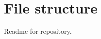 \documentclass[12pt,a4paper]{article}
\begin{document}
\section{File structure}
Readme for repository.
%
%
%
%
\end{document}
